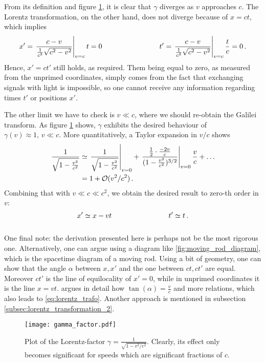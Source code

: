 From its definition and figure \ref{fig:gamma_factor}, it is clear that $\gamma$ diverges as $v$ approaches $c$. The Lorentz transformation, on the other hand, does not diverge because of $x = ct$, which implies
\begin{align*}
x' = \eval{\frac{c - v}{\frac{1}{c^2} \sqrt{c^2 - v^2}}}_{v = c} t = 0
\manyqquad
t' = \eval{\frac{c - v}{\frac{1}{c^2} \sqrt{c^2 - v^2}}}_{v = c} \frac{t}{c} = 0 \, .
\end{align*}
Hence, $x' = ct'$ still holds, as required. Them being equal to zero, as measured from the unprimed coordinates, simply comes from the fact that exchanging signals with light is impossible, so one cannot receive any information regarding times $t'$ or positions $x'$.


The other limit we have to check is $v \ll c$, where we should re-obtain the Galilei transform. As figure \ref{fig:gamma_factor} shows, $\gamma$ exhibits the desired behaviour of $\gamma(v) \approx 1, \, v \ll c$. More quantitatively, a Taylor expansion in $v / c$ shows
\begin{align*}
\frac{1}{\sqrt{1 - \frac{v^2}{c^2}}} &\simeq \eval{\frac{1}{\sqrt{1 - \frac{v^2}{c^2}}}}_{v = 0} + \eval{\frac{\frac{1}{2} \cdot \frac{-2 v}{c}}{(1 - \frac{v^2}{c^2})^{3/2}}}_{v = 0} \frac{v}{c} + \dots
\\
&= 1 + \mathcal{O}(v^2 / c^2) \, .
\end{align*}
Combining that with $v \ll c \ll c^2$, we obtain the desired result to zero-th order in $v$:
\begin{equation*}
x' \simeq x - vt
\qquad \qquad \qquad \qquad
t' \simeq t
\, .
\end{equation*}\\



One final note: the derivation presented here is perhaps not be the most rigorous one. Alternatively, one can argue using a diagram like \ref{fig:moving_rod_diagram}, which is the spacetime diagram of a moving rod. Using a bit of geometry, one can show that the angle $\alpha$ between $x, x'$ and the one between $ct, ct'$ are equal. Moreover $ct'$ is the line of equilocality of $x' = 0$, while in unprimed coordinates it is the line $x = vt$. \cite{giulini_srt} argues in detail how $\tan(\alpha) = \frac{v}{c}$ and more relations, which also leads to \eqref{eq:lorentz_trafo}. Another approach is mentioned in subsection \ref{subsec:lorentz_transformation_2}.



\begin{figure}
	\centering
	
	\texttt{[image: gamma\_factor.pdf]}
	
	\caption{Plot of the Lorentz-factor $\gamma = \frac{1}{\sqrt{1 - v^2 / c^2}}$.	Clearly, its effect only becomes significant for speeds which are significant fractions of $c$.}
	\label{fig:gamma_factor}
\end{figure}



